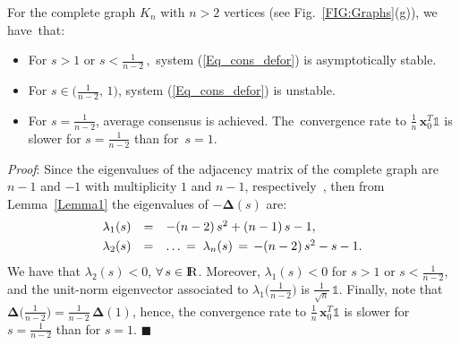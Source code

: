 \documentclass[letterpaper,9pt,twocolumn]{autart}
\newcommand{\rr}{\mathop{{\rm I}\mskip-4.0mu{\rm R}}\nolimits}
\newcommand{\vet}[1]{\ensuremath{{\mathbf #1}}}
\begin{document}
\begin{proposition}
For the complete graph $K_n$ with $n > 2$ vertices (see Fig.~\ref{FIG:Graphs}(g)), we have~that:
\begin{itemize}
\item For $s > 1$ or $s < \frac{1}{n-2}$\,,\, system (\ref{Eq_cons_defor}) is asymptotically stable.
\item For $s \in \big(\frac{1}{n-2},\,1\big)$, system (\ref{Eq_cons_defor}) is unstable.
\item For $s = \frac{1}{n-2}$, average consensus is achieved.
The~convergence rate to $\frac{1}{n}\,\vet{x}_0^T\mathds{1}$
is slower for $s = \frac{1}{n-2}$ than for~$s = 1$.
\end{itemize}
\emph{Proof}:
Since the eigenvalues of the adjacency matrix of the complete graph
are $n-1$ and $-1$ with multiplicity $1$ and $n-1$, respectively~\cite[Sect.~1.4.1]{BrouwerHa_book12}, 
then from Lemma~\ref{Lemma1} the eigenvalues of
$-\boldsymbol{\Delta}(s)$ are: $$
\begin{array}{lll}
\displaystyle \lambda_{1}(s) &=& -(n-2)\,s^2 + (n-1)\,s - 1,\vspace{0.12cm}\\
\displaystyle \lambda_{2}(s) &=& \ldots\, = \; \lambda_{n}(s) \,=\, -(n-2)\,s^2 - s - 1.
\end{array}
$$
We have that $\lambda_{2}(s) < 0$, $\forall\, s \in \rr$. Moreover,
$\lambda_{1}(s) < 0$ for $s > 1$ or $s < \frac{1}{n-2}$, and the unit-norm eigenvector associated
to $\lambda_{1}\big(\frac{1}{n-2}\big)$ is $\frac{1}{\sqrt{n}}\,\mathds{1}$.
Finally, note that $\boldsymbol{\Delta}\big(\frac{1}{n-2}\big) 
= \frac{1}{n-2}\,\boldsymbol{\Delta}(1)$,
hence, the convergence rate to $\frac{1}{n}\,\vet{x}_0^T\mathds{1}$ is slower for
$s = \frac{1}{n-2}$ than for $s = 1$.
\hfill$\blacksquare$
\end{proposition}
\end{document}
